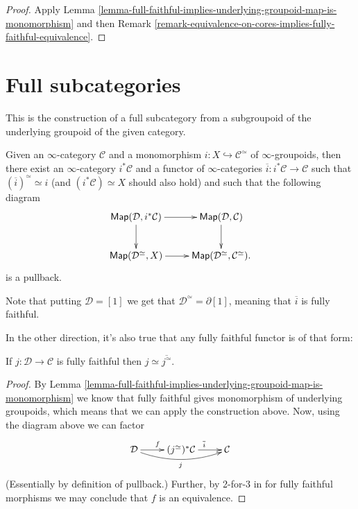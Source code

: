 \begin{proof}
Apply Lemma 
\ref{lemma-full-faithful-implies-underlying-groupoid-map-is-monomorphism}
and then Remark
\ref{remark-equivalence-on-cores-implies-fully-faithful-equivalence}.
\end{proof}

\section{Full subcategories}
\label{section-full-subcactegories}

\noindent
This is the construction of a full subcategory
from a subgroupoid of the underlying groupoid of the given category.

Given an $\infty$-category $\mathcal{C}$
and a monomorphism $i:X \hookrightarrow  \mathcal{C}^\simeq$ of $\infty$-groupoids,
then there exist an $\infty$-category $i^*\mathcal{C}$
and a functor of $\infty$-categories
$\overline{i}:i^*\mathcal{C} \to \mathcal{C}$ 
such that $(\overline{i})^\simeq \simeq i$
(and $(i^*\mathcal{C})\simeq X$ should also hold)
and such that the following diagram
$$
\xymatrix{
\mathsf{Map}(\mathcal{D},i^*\mathcal{C})\ar[r]\ar[d]&
\mathsf{Map}(\mathcal{D},\mathcal{C})\ar[d]\\
\mathsf{Map}(\mathcal{D}^\simeq,X)\ar[r]&
\mathsf{Map}(\mathcal{D}^\simeq,\mathcal{C}^\simeq).
}
$$
is a pullback.

Note that putting $\mathcal{D}=[1]$ 
we get that $\mathcal{D}^\simeq=\partial[1]$,
meaning that $\overline{i}$ is fully faithful.

In the other direction, it's also true that any fully faithful
functor is of that form:

\begin{lemma}
\label{lemma-fully-faithful-subcategories}
If $j:\mathcal{D} \to \mathcal{C}$ is fully faithful
then $j \simeq \overline{j^\simeq}$.
\end{lemma}

\begin{proof}
By Lemma
\ref{lemma-full-faithful-implies-underlying-groupoid-map-is-monomorphism}
we know that fully faithful gives monomorphism of underlying groupoids,
which means that we can apply the construction above.
Now, using the diagram above we can factor
$$
\xymatrix{
\mathcal{D}\ar[r]^f\ar@/_1em/[rr]_j
&(j^\simeq)^*\mathcal{C} \ar[r]^{\overline{i}}
&\mathcal{C}
}
$$
(Essentially by definition of pullback.)
Further, by 2-for-3 in for fully faithful morphisms we may
conclude that $f$ is an equivalence.
\end{proof}

